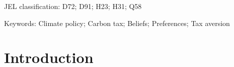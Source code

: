 \documentclass[12pt]{article} %
\begin{document}

\vspace*{0.7cm}

JEL classification: D72; D91; H23; H31; Q58

Keywords: Climate policy; Carbon tax; Beliefs; Preferences; Tax aversion %

\newpage

\newpage
\section{Introduction}

\end{document}

